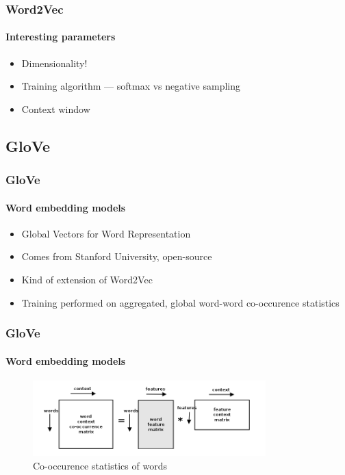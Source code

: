 \begin{frame}
\frametitle{Word2Vec}
	\framesubtitle{Interesting parameters}

	\begin{itemize}
		\item Dimensionality!
		\item Training algorithm --- softmax vs negative sampling
		\item Context window
	\end{itemize}

\end{frame}


\subsection{GloVe}


\begin{frame}
\frametitle{GloVe}
	\framesubtitle{Word embedding models}

	\begin{itemize}
		\item Global Vectors for Word Representation
		\item Comes from Stanford University, open-source
		\item Kind of extension of Word2Vec
		\item Training performed on aggregated, global word-word co-occurence statistics
	\end{itemize}

\end{frame}

\begin{frame}
\frametitle{GloVe}
	\framesubtitle{Word embedding models}

	\begin{figure}
		\includegraphics[width=9cm]{./figures/glove}
		\caption{Co-occurence statistics of words}
	\end{figure}

\end{frame}


